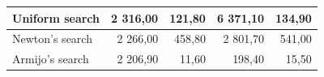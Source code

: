 \documentclass[a4paper,english,titlepage,12pt]{article}
\begin{document}
\begin{table}[H]
\begin{tabular}{|l|r|r|r|r|}
    Uniform search                                                             & \cellcolor[HTML]{FDF0EF}2 316,00                         & \cellcolor[HTML]{FDF0EF}121,80                            & \cellcolor[HTML]{E67B73}6 371,10                          & \cellcolor[HTML]{FDF0EF}134,90                            \\ \hline
    Newton's search                                                             & 2 266,00                                                 & \cellcolor[HTML]{E67B73}458,80                            & \cellcolor[HTML]{F6CFCB}2 801,70                          & \cellcolor[HTML]{E67B73}541,00                            \\ \hline
    Armijo's search                                                              & \cellcolor[HTML]{E5F4ED}2 206,90                         & \cellcolor[HTML]{57BB89}11,60                             & \cellcolor[HTML]{57BB89}198,40                            & \cellcolor[HTML]{57BB89}15,50                             \\ \hline
    \end{tabular}
\end{table}
\end{document}

